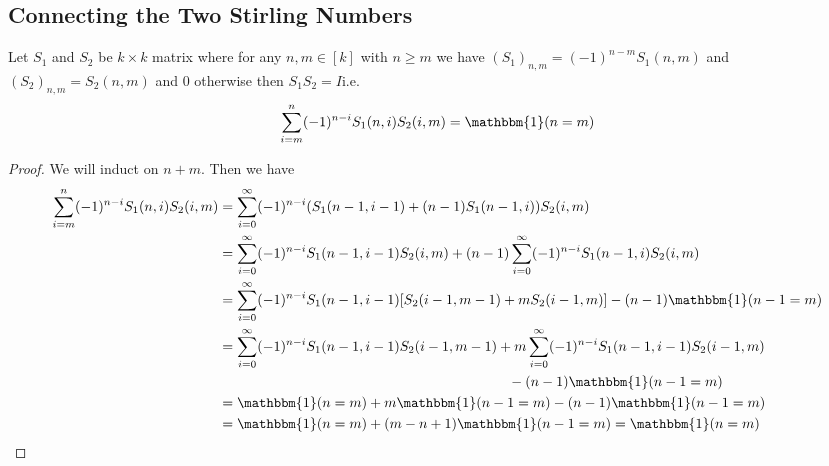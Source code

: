 \documentclass[twoside]{article}
\begin{document}
\subsection{Connecting the Two Stirling Numbers}
\begin{Theorem}{}{}
	Let $S_1$ and $S_2$ be $k\times k$ matrix where for any $n,m\in [k]$ with $n\geq m$ we have $(S_1)_{n,m}=(-1)^{n-m}S_1(n,m)$ and $(S_2)_{n,m}=S_2(n,m)$ and $0$ otherwise then $S_1S_2=I$i.e. $$\displaystyle\sum\limits_{i=m}^n(-1)^{n-i}S_1(n,i)S_2(i,m)=\mathbbm{1}(n=m)$$
\end{Theorem}
\begin{proof}
	We will induct on $n+m$. Then we have \begin{align*}
		\sum\limits_{i=m}^n(-1)^{n-i}S_1(n,i)S_2(i,m) & = \sum_{i=0}^{\infty} (-1)^{n-i}(S_1(n-1,i-1)+(n-1)S_1(n-1,i))S_2(i,m)\\
		& = \sum_{i=0}^{\infty} (-1)^{n-i}S_1(n-1,i-1)S_2(i,m)+ (n-1)\sum_{i=0}^{\infty} (-1)^{n-i}S_1(n-1,i)S_2(i,m)\\
		& = \sum_{i=0}^{\infty} (-1)^{n-i}S_1(n-1,i-1)[S_2(i-1,m-1)+mS_2(i-1,m)] - (n-1)\mathbbm{1}(n-1=m)\\
		& = \sum_{i=0}^{\infty} (-1)^{n-i}S_1(n-1,i-1)S_2(i-1,m-1)+m\sum_{i=0}^{\infty} (-1)^{n-i}S_1(n-1,i-1)S_2(i-1,m)\\
		& \hskip0.6\textwidth-(n-1)\mathbbm{1}(n-1=m)\\
		& = \mathbbm{1}(n=m)+m\mathbbm{1}(n-1=m)-(n-1)\mathbbm{1}(n-1=m)\\
		& =  \mathbbm{1}(n=m)+(m-n+1)\mathbbm{1}(n-1=m)= \mathbbm{1}(n=m)
	\end{align*}
\end{proof}
\end{document}
